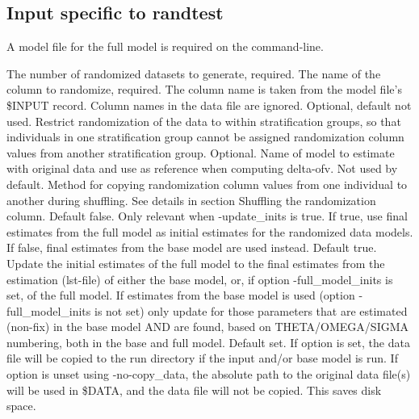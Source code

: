 \subsection{Input specific to randtest}
A model file for the full model is required on the command-line.
\begin{optionlist}
The number of randomized datasets to generate, required. 
\nextopt
{}
The name of the column to randomize, required. The column name is taken from the model file's \$INPUT record. Column names in the data file are ignored. 
\nextopt
{}
Optional, default not used. Restrict randomization of the data to within stratification groups, so that individuals in one stratification group cannot be assigned randomization column values from another stratification group. 
\nextopt
{}
Optional. Name of model to estimate with original data and use as reference when computing delta-ofv. 
\nextopt
{}
Not used by default. Method for copying randomization column values from one individual to another during shuffling. See details in section Shuffling the randomization column.     
\nextopt
{}
Default false. Only relevant when -update\_inits is true. If true, use final estimates from
the full model as initial estimates for the randomized data models. If false,
final estimates from the base model are used instead.
\nextopt
{}
Default true. Update the initial estimates of the 
full model to the final estimates from the estimation (lst-file) of either the base model,
or, if option -full\_model\_inits is set, of the full model.
If estimates from the base model is used (option -full\_model\_inits is not set)
only update for those parameters that are estimated (non-fix) in the base model AND are found,
based on THETA/OMEGA/SIGMA numbering, both in the base and full model.
\nextopt
{}
Default set. If option is set, the data file
will be copied to the run directory if the input and/or base model is run.
If option is unset using -no-copy\_data, the absolute path to the original data file(s) will be used in
\$DATA, and the data file will not be copied. This saves disk space.
\nextopt
\end{optionlist}

